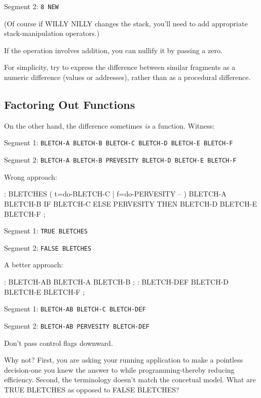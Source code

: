 Segment 2:    \texttt{8 NEW}

\bigskip

\noindent 
(Of course if WILLY NILLY changes the stack, you'll need to add appropriate stack-manipulation operators.)

If the operation involves addition, you can nullify it by passing a zero.

\begin{tip}
For simplicity, try to express the difference between similar fragments as a numeric difference (values or addresses), rather than as a procedural difference.
\end{tip}


\subsection{{Factoring Out Functions}}
On the other hand, the difference sometimes \emph{is} a function. Witness:

\bigskip


Segment 1:	\texttt{BLETCH-A BLETCH-B BLETCH-C BLETCH-D BLETCH-E BLETCH-F}

Segment 2:	\texttt{BLETCH-A BLETCH-B PREVESITY BLETCH-D BLETCH-E BLETCH-F}

\bigskip

\noindent
Wrong approach:

\begin{Code}
: BLETCHES ( t=do-BLETCH-C | f=do-PERVESITY -- ) 
   BLETCH-A BLETCH-B IF BLETCH-C ELSE PERVESITY 
      THEN BLETCH-D BLETCH-E BLETCH-F ;
\end{Code}

\noindent 
Segment 1:	\texttt{TRUE BLETCHES}

\noindent
Segment 2:	\texttt{FALSE BLETCHES}

\bigskip

\noindent 
A better approach:

\begin{Code}
: BLETCH-AB BLETCH-A BLETCH-B ;
: BLETCH-DEF BLETCH-D BLETCH-E BLETCH-F ;
\end{Code}

\indent Segment 1:	\texttt{BLETCH-AB BLETCH-C BLETCH-DEF}

\indent Segment 2:	\texttt{BLETCH-AB PERVESITY BLETCH-DEF}

\begin{tip}
Don't pass control flags downward.
\end{tip}
Why not? First, you are asking your running application to make a pointless decision-one you knew the answer to while programming-thereby reducing efficiency. Second, the terminology doesn't match the concetual model. What are TRUE BLETCHES as opposed to FALSE BLETCHES?

